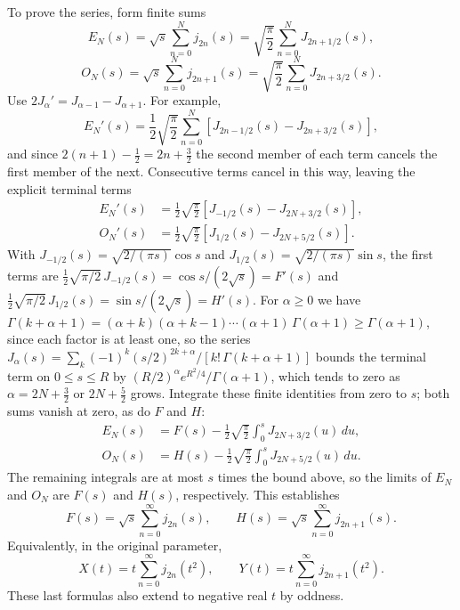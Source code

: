 To prove the series, form finite sums
\[
E_N(s)=\sqrt s\sum_{n=0}^Nj_{2n}(s)
=\sqrt{\frac\pi2}\sum_{n=0}^NJ_{2n+1/2}(s),
\]
\[
O_N(s)=\sqrt s\sum_{n=0}^Nj_{2n+1}(s)
=\sqrt{\frac\pi2}\sum_{n=0}^NJ_{2n+3/2}(s).
\]
Use $2J_\alpha'=J_{\alpha-1}-J_{\alpha+1}$. For example,
\[
E_N'(s)=\frac12\sqrt{\frac\pi2}\sum_{n=0}^N
[J_{2n-1/2}(s)-J_{2n+3/2}(s)],
\]
and since $2(n+1)-\frac12=2n+\frac32$ the second member of each
term cancels the first member of the next. Consecutive
terms cancel in this way, leaving the explicit terminal terms
\begin{align*}
E_N'(s)&=\frac12\sqrt{\frac\pi2}
[J_{-1/2}(s)-J_{2N+3/2}(s)],\\
O_N'(s)&=\frac12\sqrt{\frac\pi2}
[J_{1/2}(s)-J_{2N+5/2}(s)].
\end{align*}
With $J_{-1/2}(s)=\sqrt{2/(\pi s)}\cos s$ and
$J_{1/2}(s)=\sqrt{2/(\pi s)}\sin s$, the first terms are
$\frac12\sqrt{\pi/2}\,J_{-1/2}(s)=\cos s/(2\sqrt s)=F'(s)$ and
$\frac12\sqrt{\pi/2}\,J_{1/2}(s)=\sin s/(2\sqrt s)=H'(s)$.
For $\alpha\ge0$ we have
$\Gamma(k+\alpha+1)=(\alpha+k)(\alpha+k-1)\cdots(\alpha+1)\,
\Gamma(\alpha+1)\ge\Gamma(\alpha+1)$, since each factor is at
least one, so the series
$J_\alpha(s)=\sum_k(-1)^k(s/2)^{2k+\alpha}/[k!\,\Gamma(k+\alpha+1)]$
bounds the terminal term on $0\le s\le R$
by $(R/2)^\alpha e^{R^2/4}/\Gamma(\alpha+1)$, which tends to zero
as $\alpha=2N+\frac32$ or $2N+\frac52$ grows. Integrate these finite
identities from zero to $s$; both sums vanish at zero, as do $F$
and $H$:
\begin{align*}
E_N(s)&=F(s)-\frac12\sqrt{\frac\pi2}\int_0^sJ_{2N+3/2}(u)\,du,\\
O_N(s)&=H(s)-\frac12\sqrt{\frac\pi2}\int_0^sJ_{2N+5/2}(u)\,du.
\end{align*}
The remaining integrals are at most $s$ times the bound above, so
the limits of $E_N$ and $O_N$ are $F(s)$ and $H(s)$, respectively.
This establishes
\[
\boxed{F(s)=\sqrt s\sum_{n=0}^\infty j_{2n}(s),\qquad
H(s)=\sqrt s\sum_{n=0}^\infty j_{2n+1}(s).}
\]
Equivalently, in the original parameter,
\[
\boxed{X(t)=t\sum_{n=0}^\infty j_{2n}(t^2),\qquad
Y(t)=t\sum_{n=0}^\infty j_{2n+1}(t^2).}
\]
These last formulas also extend to negative real $t$ by oddness.

